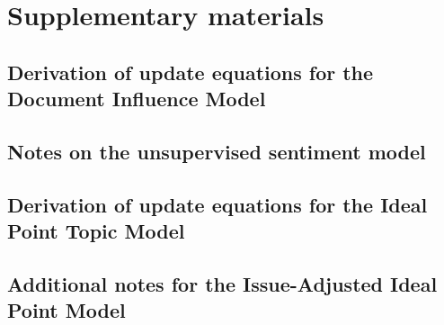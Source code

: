 \chapter{Supplementary materials}

\label{chapter:supplementary_materials}

\section{Derivation of update equations for the Document Influence Model}




\section{Notes on the unsupervised sentiment model}


\section{Derivation of update equations for the Ideal Point Topic Model}


\section{Additional notes for the Issue-Adjusted Ideal Point Model}






